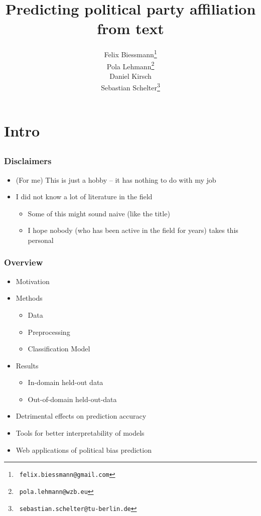 \documentclass[]{beamer}
\institute[]{}
\title[]{
{
\vspace{1em}
\small
Predicting political party affiliation from text
}}
\author{
Felix Biessmann\thanks{~\tt felix.biessmann@gmail.com}\\
 Pola Lehmann\thanks{ ~{\tt pola.lehmann@wzb.eu} }\\
Daniel Kirsch\\
  Sebastian Schelter\thanks{~\tt sebastian.schelter@tu-berlin.de}\\
}
\begin{document}
\begin{frame} 
\titlepage 
\end{frame}	


\section{Intro}
\subsection{}

\begin{frame}\frametitle{Disclaimers}
\small
\begin{itemize}[<+->]
\item (For me) This is just a hobby -- it has nothing to do with my job
\item I did not know a lot of literature in the field 
\begin{itemize}
\item Some of this might sound naive (like the title)
\item I hope nobody (who has been active in the field for years) takes this personal
\end{itemize}
\end{itemize}
\end{frame}


\begin{frame}\frametitle{Overview}
\small
\begin{itemize}[<+->]
\item Motivation
\item Methods 
\begin{itemize}
\item Data
\item Preprocessing
\item Classification Model
\end{itemize}
\item Results
\begin{itemize}
\item In-domain held-out data
\item Out-of-domain held-out-data
\end{itemize}
\item Detrimental effects on prediction accuracy
\item Tools for better interpretability of models
\item Web applications of political bias prediction
\end{itemize}
\end{frame}
\end{document}
